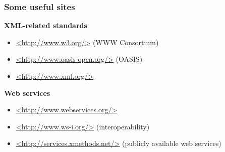 

\frame
{
	\frametitle{Some useful sites}
	
	\textbf{XML-related standards}
		
	\begin{itemize}
	
		\item \url{<http://www.w3.org/>} (WWW Consortium)
		
		\item \url{<http://www.oasis-open.org/>} (OASIS)
		
		\item \url{<http://www.xml.org/>}
		
	\end{itemize}
	
	\textbf{Web services}
	
	\begin{itemize}
		
		\item \url{<http://www.webservices.org/>}
	
		\item \url{<http://www.ws-i.org/>} (interoperability)
		
		\item \url{<http://services.xmethods.net/>} (publicly available
		web services)
	
	\end{itemize}
	
	\note{~}
}







